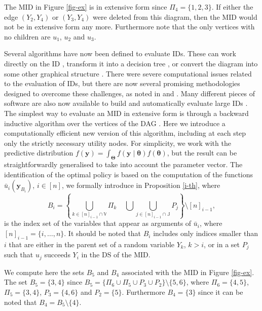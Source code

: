 \begin{example}
The MID in Figure \ref{fig-ex} is in extensive form since $\Pi_4=\{1,2,3\}$. If either the edge $(Y_2,Y_4)$ or $(Y_3,Y_4)$ were deleted from this diagram, then the MID would not be in extensive form any more. Furthermore note that the only vertices with no children are $u_1$, $u_2$ and $u_3$. 
\end{example}

Several algorithms have now been defined to evaluate IDs. These can work directly on the ID \citep{Shachter1986,Olmsted1983}, transform it into a decision tree \citep{Canbolat2007}, or convert the diagram into some other graphical structure \citep{Jensen1994,Madsen1999}. There were severe computational issues related to the evaluation of IDs, but there are now several  promising methodologies designed to overcome these challenges, as noted in \citet{Bielza2011} and \citet{Gomez2007}. Many different pieces of software are also now available to build and automatically evaluate large IDs \citep{Jensen2013}. The simplest way to evaluate an MID in extensive form is through a backward inductive algorithm over the vertices of the DAG \citep[see e.g.][]{Jensen2009}. Here we introduce a computationally efficient new version of this algorithm, including at each step only the strictly necessary utility nodes. For simplicity, we work with the predictive distribution $f(\bm{y})=\int_{\bm{\Theta}}f(\bm{y}\;|\;\bm{\theta})f(\bm{\theta})$, but the result can be straightforwardly generalised to take into account the parameter vector.  The identification of the optimal policy is based on the computation of the functions $\bar{u}_i(\bm{y}_{B_i})$, $i\in[n]$, we formally introduce in Proposition \ref{i-th}, where 
\begin{equation}
\label{Ai}
B_i=\left\{\bigcup_{k\in[n]_{i-1}\cap\mathbb{V}}\Pi_k\;\;\;\;\bigcup\bigcup_{j\in[n]_{i-1}\cap \mathbb{J}}P_j\right\}\setminus[n]_{i-1},
\end{equation}
is the index set of the variables that appear as arguments of $\bar{u}_i$, where $[n]_{i-1}=\{i,\dots,n\}$. It should be noted that $B_i$ includes only indices smaller than $i$ that are either in the parent set of a random variable $Y_k$, $k>i$, or in a set $P_j$ such that $u_j$ succeeds $Y_i$ in the DS of the MID.

\begin{example}
We compute here the sets $B_5$ and $B_4$ associated with the MID in Figure \ref{fig-ex}. The set $B_5=\{3,4\}$ since $B_5=\{\Pi_6\cup \Pi_5\cup P_3\cup P_2\}\setminus\{5,6\}$, where $\Pi_6=\{4,5\}$, $\Pi_5=\{3,4\}$, $P_3=\{4,6\}$ and $P_2=\{5\}$. Furthermore $B_4=\{3\}$ since it can be noted that $B_4=B_5\setminus \{4\}$.
\end{example}

